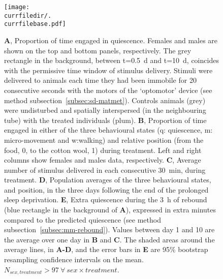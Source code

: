 \begin{figure}[h!]
	\centering   
	\texttt{[image: \\currfiledir/.\\currfilebase.pdf]}
	\caption[Prolonged sleep deprivation is effective]{
		\textbf{A}, Proportion of time engaged in quiescence.
		Females and males are shown on the top and bottom panels, respectively.
		The grey rectangle in the background,
		between t=0.5~d and t=10~d, %
		coincides with the permissive time window of stimulus delivery.
		Stimuli were delivered to animals each time they had been immobile for 20 consecutive seconds with the motors of the `optomotor' device
		(see method subsection~\ref{subsec:sd-matmet}). %
		Controls animals (grey) were undisturbed and spatially interspersed (in the neighbouring tube) with the treated individuals (plum).
		\textbf{B}, Proportion of time engaged in either of the three behavioural states (q: quiescence, m: micro-movement and w:walking) and relative position (from the food, 0, to the cotton wool, 1) during treatment.
		Left and right columns show females and males data, respectively.
		\textbf{C}, Average number of stimulus delivered in each consecutive 30~min, during treatment.
		\textbf{D}, Population averages of the three behavioural states, and position, in the three days following the end of the prolonged sleep deprivation.
		\textbf{E}, Extra quiescence during the 3~h of rebound (blue rectangle in the background of \textbf{A}),
		expressed in extra minutes compared to the predicted quiescence (see method subsection~\ref{subsec:mm-rebound}).
		Values between day 1 and 10 are the average over one day in \textbf{B} and \textbf{C}.
		The shaded areas around the average lines, in \textbf{A-D}, and the error bars in \textbf{E} are 95\% bootstrap resampling confidence intervals on the mean.
		$N_{sex,treatment} > 97~\forall~sex \times treatment$.
		\label{fig:\currfilebase}
	}
\end{figure}
